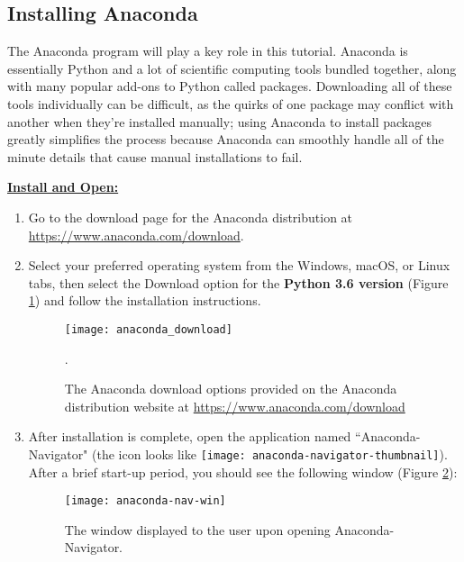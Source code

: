\subsection{Installing Anaconda}
The Anaconda program will play a key role in this tutorial. Anaconda is essentially Python and a lot of scientific computing tools bundled together, along with many popular add-ons to Python called packages.  Downloading all of these tools individually can be difficult, as the quirks of one package may conflict with another when they're installed manually; using Anaconda to install packages greatly simplifies the process because Anaconda can smoothly handle all of the minute details that cause manual installations to fail.

\textbf{\underline{Install and Open:}}

\begin{enumerate}
    \item Go to the download page for the Anaconda distribution at \\ \url{https://www.anaconda.com/download}. 
    \item Select your preferred operating system from the Windows, macOS, or Linux tabs, then select the Download option for the \textbf{Python 3.6 version} (Figure \ref{anaconda_download}) and follow the installation instructions.
    \begin{figure}[h]
        \begin{center}
        \texttt{[image: anaconda\_download]}
        \caption{The Anaconda download options provided on the Anaconda distribution website at \protect \url{https://www.anaconda.com/download}}.
        \label{anaconda_download}
        \end{center}
    \end{figure}


    \item After installation is complete, open the application named ``Anaconda-Navigator" (the icon looks like \texttt{[image: anaconda-navigator-thumbnail]}). After a brief start-up period, you should see the following window (Figure \ref{anaconda-nav-win}):
    \begin{figure}[htbp]
        \begin{center}
        \texttt{[image: anaconda-nav-win]}
        \caption{The window displayed to the user upon opening Anaconda-Navigator.}
        \label{anaconda-nav-win}
        \end{center}
    \end{figure}
\end{enumerate}

